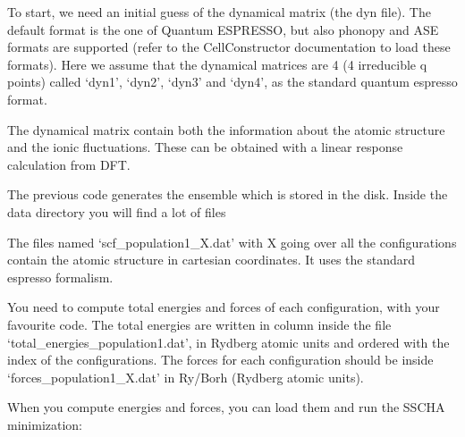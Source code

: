 \documentclass[a4paper,11pt,english]{sphinxmanual}
\begin{document}
\sphinxAtStartPar
To start, we need an initial guess of the dynamical matrix (the dyn file).
The default format is the one of Quantum ESPRESSO, but also phonopy and
ASE formats are supported (refer to the CellConstructor documentation to load these formats). Here we assume that the dynamical matrices are 4 (4 irreducible q points) called ‘dyn1’, ‘dyn2’, ‘dyn3’ and ‘dyn4’, as the standard quantum espresso format.

\sphinxAtStartPar
The dynamical matrix contain both the information about the atomic structure
and the ionic fluctuations. These can be obtained with a linear response
calculation from DFT.

\sphinxAtStartPar
The previous code generates the ensemble which is stored in the disk.
Inside the data directory you will find a lot of files

\sphinxAtStartPar
The files named ‘scf\_population1\_X.dat’ with X going over all the configurations contain the atomic structure in cartesian coordinates. It uses the standard espresso formalism.

\sphinxAtStartPar
You need to compute total energies and forces of each configuration, with your favourite code.
The total energies are written in column inside the file ‘total\_energies\_population1.dat’, in Rydberg atomic units and ordered with the index of the configurations.
The forces for each configuration should be inside ‘forces\_population1\_X.dat’ in Ry/Borh (Rydberg atomic units).

\sphinxAtStartPar
When you compute energies and forces, you can load them and run the SSCHA minimization:
\end{document}
